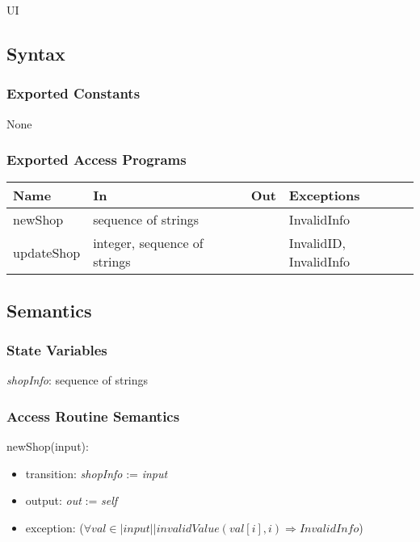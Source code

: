 \documentclass[12pt, titlepage]{article}
\begin{document}
UI

\subsection{Syntax}

\subsubsection{Exported Constants}

None

\subsubsection{Exported Access Programs}

\begin{center}
\begin{tabular}{p{2cm} p{4cm} p{4cm} p{2cm}}
\hline
\textbf{Name} & \textbf{In} & \textbf{Out} & \textbf{Exceptions} \\
\hline
newShop & sequence of strings &  & InvalidInfo \\
updateShop & integer, sequence of strings &  & InvalidID, InvalidInfo \\
\hline
\end{tabular}
\end{center}

\subsection{Semantics}

\subsubsection{State Variables}

\textit{shopInfo}: sequence of strings

\subsubsection{Access Routine Semantics}

\noindent newShop(input):
\begin{itemize}
\item transition: \textit{shopInfo} := \textit{input}
\item output: \textit{out} := \textit{self}
\item exception: ($\forall val \in |input| | invalidValue(val[i], i) \Rightarrow InvalidInfo$)
\end{itemize}
\end{document}
